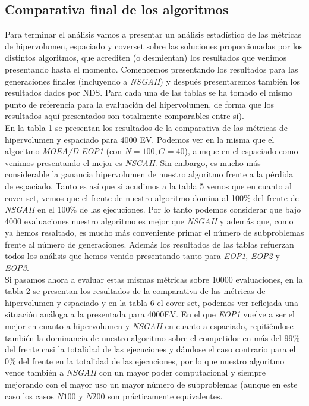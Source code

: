 
\subsection{Comparativa final de los algoritmos}

Para terminar el análisis vamos a presentar un análisis estadístico de las métricas de hipervolumen, espaciado y coverset sobre las soluciones proporcionadas por los distintos algoritmos, que acrediten (o desmientan) los resultados que venimos presentando hasta el momento. Comencemos presentando los resultados para las generaciones finales (incluyendo a \textit{NSGAII}) y después presentaremos también los resultados dados por NDS. Para cada una de las tablas se ha tomado el mismo punto de referencia para la evaluación del hipervolumen, de forma que los resultados aquí presentados son totalmente comparables entre sí).\\

En la \hyperref[table:1]{tabla 1} se presentan los resultados de la comparativa de las métricas de hipervolumen y espaciado para 4000 EV. Podemos ver en la misma que el algoritmo \textit{MOEA/D EOP1} (con $N=100, G=40$), aunque en el espaciado como venimos presentando el mejor es \textit{NSGAII}. Sin embargo, es mucho más considerable la ganancia hipervolumen de nuestro algoritmo frente a la pérdida de espaciado. Tanto es así que si acudimos a la \hyperref[table:5]{tabla 5} vemos que en cuanto al cover set, vemos que el frente de nuestro algoritmo domina al 100\% del frente de \textit{NSGAII} en el 100\% de las ejecuciones. Por lo tanto podemos considerar que bajo 4000 evaluaciones nuestro algoritmo es mejor que \textit{NSGAII} y además que, como ya hemos resaltado, es mucho más conveniente primar el número de subproblemas frente al número de generaciones. Además los resultados de las tablas refuerzan todos los análisis que hemos venido presentando tanto para \textit{EOP1}, \textit{EOP2} y \textit{EOP3}. \\

Si pasamos ahora a evaluar estas mismas métricas sobre 10000 evaluaciones, en la \hyperref[table:2]{tabla 2} se presentan los resultados de la comparativa de las métricas de hipervolumen y espaciado y en la \hyperref[table:6]{tabla 6} el cover set, podemos ver reflejada una situación análoga a la presentada para 4000EV. En el que \textit{EOP1} vuelve a ser el mejor en cuanto a hipervolumen y \textit{NSGAII} en cuanto a espaciado, repitiéndose también la dominancia de nuestro algoritmo sobre el competidor en más del 99\% del frente casi la totalidad de las ejecuciones y dándose el caso contrario para el 0\% del frente en la totalidad de las ejecuciones, por lo que nuestro algoritmo vence también a \textit{NSGAII} con un mayor poder computacional y siempre mejorando con el mayor uso  un mayor número de subproblemas (aunque en este caso los casos $N100$ y $N200$ son prácticamente equivalentes.\\


